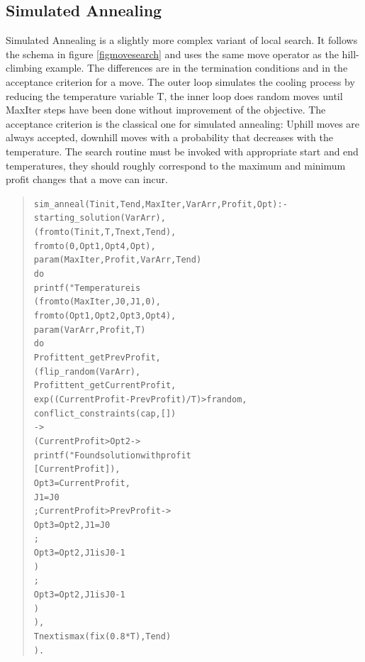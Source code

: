 \newpage
\subsection{Simulated Annealing}

Simulated Annealing is a slightly more complex variant of local search.
It follows the schema in figure \ref{figmovesearch} and uses the same
move operator as the hill-climbing example.
The differences are in the termination conditions and in the
acceptance criterion for a move.
The outer loop simulates the cooling process by reducing the temperature
variable T, the inner loop does random moves until MaxIter steps have been
done without improvement of the objective.
The acceptance criterion is the classical one for simulated annealing:
Uphill moves are always accepted, downhill moves with a probability
that decreases with the temperature. The search routine must be invoked
with appropriate start and end temperatures, they should roughly correspond
to the maximum and minimum profit changes that a move can incur.
\begin{quote}\begin{alltt}
sim_anneal(Tinit, Tend, MaxIter, VarArr, Profit, Opt) :-
        starting_solution(VarArr),              %
        (   fromto(Tinit, T, Tnext, Tend),
            fromto(0, Opt1, Opt4, Opt),
            param(MaxIter,Profit,VarArr,Tend)
        do
            printf("Temperature is %
            (    fromto(MaxIter, J0, J1, 0),
                fromto(Opt1, Opt2, Opt3, Opt4),
                param(VarArr,Profit,T)
            do
                Profit tent_get PrevProfit,
                (   flip_random(VarArr),        %
                    Profit tent_get CurrentProfit,
                    exp((CurrentProfit-PrevProfit)/T) > frandom,
                    conflict_constraints(cap,[])   %
                ->
                    ( CurrentProfit > Opt2 ->   %
                        printf("Found solution with profit %
                                    [CurrentProfit]),
                        Opt3=CurrentProfit,     %
                        J1=J0
                    ; CurrentProfit > PrevProfit ->
                        Opt3=Opt2, J1=J0        %
                    ;
                        Opt3=Opt2, J1 is J0-1   %
                    )
                ;
                    Opt3=Opt2, J1 is J0-1       %
                )
            ),
            Tnext is max(fix(0.8*T),Tend)
        ).
\end{alltt}\end{quote}

